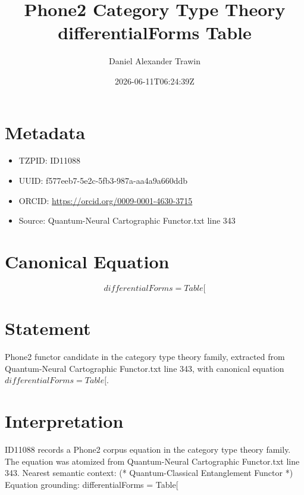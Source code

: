 \documentclass[11pt]{article}
\title{Phone2 Category Type Theory differentialForms Table}
\author{Daniel Alexander Trawin}
\date{2026-06-11T06:24:39Z}
\begin{document}
\maketitle
\section*{Metadata}
\begin{itemize}
\item TZPID: ID11088
\item UUID: f577eeb7-5e2c-5fb3-987a-aa4a9a660ddb
\item ORCID: \url{https://orcid.org/0009-0001-4630-3715}
\item Source: Quantum-Neural Cartographic Functor.txt line 343
\end{itemize}
\section*{Canonical Equation}
\[
differentialForms = Table[
\]
\section*{Statement}
Phone2 functor candidate in the category type theory family, extracted from Quantum-Neural Cartographic Functor.txt line 343, with canonical equation $differentialForms = Table[$.
\section*{Interpretation}
ID11088 records a Phone2 corpus equation in the category type theory family. The equation was atomized from Quantum-Neural Cartographic Functor.txt line 343. Nearest semantic context: (* Quantum-Classical Entanglement Functor *) Equation grounding: differentialForms = Table[
\end{document}
